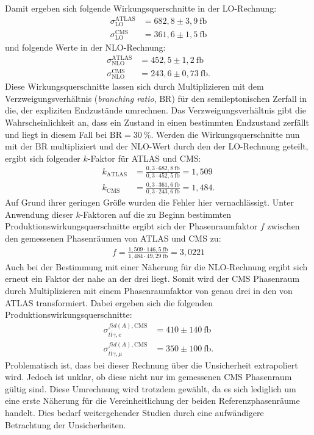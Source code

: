 Damit ergeben sich folgende Wirkungsquerschnitte in der LO-Rechnung:
\begin{align}
  \sigma^{\text{ATLAS}}_{\text{LO}} &= 682,8 \pm 3,9~ \si{\femto\barn}\\
  \sigma^{\text{CMS}}_{\text{LO}} &= 361,6 \pm 1,5~ \si{\femto\barn}
\end{align}
und folgende Werte in der NLO-Rechnung:
\begin{align}
  \sigma^{\text{ATLAS}}_{\text{NLO}} &= 452,5 \pm 1,2~ \si{\femto\barn}\\
  \sigma^{\text{CMS}}_{\text{NLO}} &= 243,6 \pm 0,73~ \si{\femto\barn}.
\end{align}
Diese Wirkungsquerschnitte lassen sich durch Multiplizieren mit dem Verzweigungsverhältnis (\textit{branching ratio}, $\mathrm{BR}$) für den semileptonischen Zerfall in die, der expliziten Endzustände umrechnen. Das Verzweigungsverhältnis gibt die Wahrscheinlichkeit an, dass ein Zustand in einen bestimmten Endzustand zerfällt und liegt in diesem Fall bei $\mathrm{BR}=\SI{30}{\percent}$. Werden die Wirkungsquerschnitte nun mit der $\mathrm{BR}$ multipliziert und der NLO-Wert durch den der LO-Rechnung geteilt, ergibt sich folgender $k$-Faktor für ATLAS und CMS:
\begin{align}
  k_{\text{ATLAS}} &= \frac{0,3 \cdot 682,8~ \si{\femto\barn}}{0,3 \cdot 452,5~ \si{\femto\barn}} = 1,509\\
  k_{\text{CMS}} &= \frac{0,3 \cdot 361,6~ \si{\femto\barn}}{0,3 \cdot 243,6~ \si{\femto\barn}} = 1,484.
\end{align}
Auf Grund ihrer geringen Größe wurden die Fehler hier vernachlässigt. Unter Anwendung dieser $k$-Faktoren auf die zu Beginn bestimmten Produktionswirkungsquerschnitte ergibt sich der Phasenraumfaktor $f$ zwischen den gemessenen Phasenräumen von ATLAS und CMS zu:
\begin{align}
  f = \frac{1,509 \cdot 146,5~ \si{\femto\barn}}{1,484 \cdot 49,29~ \si{\femto\barn}} = 3,0221
\end{align}
Auch bei der Bestimmung mit einer Näherung für die NLO-Rechnung ergibt sich erneut ein Faktor der nahe an der drei liegt. Somit wird der CMS Phasenraum durch Multiplizieren mit einem Phasenraumfaktor von genau drei in den von ATLAS transformiert. Dabei ergeben sich die folgenden Produktionswirkungsquerschnitte:
\begin{align}
  \sigma^{fid(A), \text{CMS}}_{t\bar{t}\gamma, e} &= 410 \pm 140~ \si{\femto\barn}\\
  \sigma^{fid(A), \text{CMS}}_{t\bar{t}\gamma, \mu} &= 350 \pm 100~ \si{\femto\barn}.
\end{align}
Problematisch ist, dass bei dieser Rechnung über die Unsicherheit extrapoliert wird. Jedoch ist unklar, ob diese nicht nur im gemessenen CMS Phasenraum gültig sind. Diese Umrechnung wird trotzdem gewählt, da es sich lediglich um eine erste Näherung für die Vereinheitlichung der beiden Referenzphasenräume handelt. Dies bedarf weitergehender Studien durch eine aufwändigere Betrachtung der Unsicherheiten.
%
%

